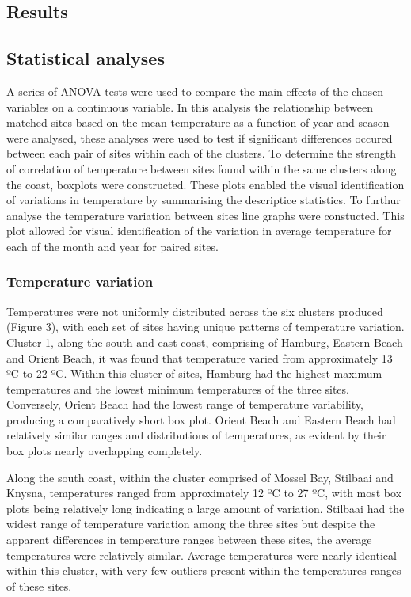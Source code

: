 \documentclass[12pt,A4paper,]{article}
\begin{document}
\subsection{Results}\label{results}

\subsection{Statistical analyses}\label{statistical-analyses}

A series of ANOVA tests were used to compare the main effects of the
chosen variables on a continuous variable. In this analysis the
relationship between matched sites based on the mean temperature as a
function of year and season were analysed, these analyses were used to
test if significant differences occured between each pair of sites
within each of the clusters. To determine the strength of correlation of
temperature between sites found within the same clusters along the
coast, boxplots were constructed. These plots enabled the visual
identification of variations in temperature by summarising the
descriptice statistics. To furthur analyse the temperature variation
between sites line graphs were constucted. This plot allowed for visual
identification of the variation in average temperature for each of the
month and year for paired sites.

\subsubsection{Temperature variation}\label{temperature-variation}

Temperatures were not uniformly distributed across the six clusters
produced (Figure 3), with each set of sites having unique patterns of
temperature variation. Cluster 1, along the south and east coast,
comprising of Hamburg, Eastern Beach and Orient Beach, it was found that
temperature varied from approximately 13 ºC to 22 ºC. Within this
cluster of sites, Hamburg had the highest maximum temperatures and the
lowest minimum temperatures of the three sites. Conversely, Orient Beach
had the lowest range of temperature variability, producing a
comparatively short box plot. Orient Beach and Eastern Beach had
relatively similar ranges and distributions of temperatures, as evident
by their box plots nearly overlapping completely.

Along the south coast, within the cluster comprised of Mossel Bay,
Stilbaai and Knysna, temperatures ranged from approximately 12 ºC to 27
ºC, with most box plots being relatively long indicating a large amount
of variation. Stilbaai had the widest range of temperature variation
among the three sites but despite the apparent differences in
temperature ranges between these sites, the average temperatures were
relatively similar. Average temperatures were nearly identical within
this cluster, with very few outliers present within the temperatures
ranges of these sites.
\end{document}

